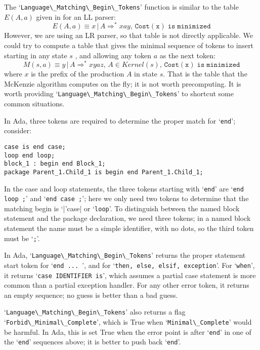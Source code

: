 \documentclass{article}
\newcommand{\code}[1]{`\lstinline|#1|'}
\begin{document}
The \code{Language\_Matching\_Begin\_Tokens} function is similar to the
table\\ $E(A,a)$ given in \cite{FMQ 1980} for an LL parser:
\begin{equation}
E(A,a) \equiv x \, | \, A \Rightarrow^* xay, \, \mathtt{Cost(x)\; is\; minimized}
\end{equation}
However, we are using an LR parser, so that table is not directly
applicable. We could try to compute a table that gives the minimal
sequence of tokens to insert starting in any state $s$ , and
allowing any token $a$ as the next token:
\begin{equation}
M(s,a) \equiv y \, | \, A \Rightarrow^* xyaz, \, A \in Kernel(s), \, \mathtt{Cost(x)\; is\; minimized}
\end{equation}
where $x$ is the prefix of the production $A$ in state $s$.
That is the table that the McKenzie algorithm computes on the fly; it
is not worth precomputing. It is worth providing
\code{Language\_Matching\_Begin\_Tokens} to shortcut some common
situations.

In Ada, three tokens are required to determine the proper match for
\code{end}; consider:
\begin{lstlisting}
case is end case;
loop end loop;
block_1 : begin end Block_1;
package Parent_1.Child_1 is begin end Parent_1.Child_1;
\end{lstlisting}
In the case and loop statements, the three tokens starting with
\code{end} are \code{end loop ;} and \code{end case ;}; here we only
need two tokens to determine that the matching begin is \code|case| or
\code{loop}.
To distinguish between the named block statement and the package
declaration, we need three tokens; in a named block statement the name
must be a simple identifier, with no dots, so the third token must be
\code{;}.

In Ada, \code{Language\_Matching\_Begin\_Tokens} returns the proper
statement start token for \code{end ... }, and for
\code{then, else, elsif, exception}. For \code{when}, it returns
\code{case IDENTIFIER is}, which assumes a partial case statement is
more common than a partial exception handler. For any other error
token, it returns an empty sequence; no guess is better than a bad
guess.

\code{Language\_Matching\_Begin\_Tokens} also returns a flag\\
\code{Forbid\_Minimal\_Complete}, which is True when
\code{Minimal\_Complete} would be harmful. In Ada, this is set True
when the error point is after \code{end} in one of the \code{end}
sequences above; it is better to push back \code{end}.
\end{document}
